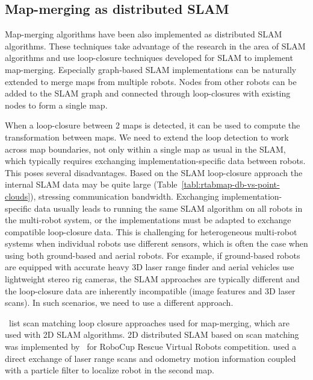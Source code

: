 \subsection{Map-merging as distributed SLAM}
\label{sec:map-merging-distributed-slam}

Map-merging algorithms have been also implemented as distributed \gls{SLAM} algorithms. These techniques take advantage of the research in the area of \gls{SLAM} algorithms and use loop-closure techniques developed for \gls{SLAM} to implement map-merging. Especially graph-based \gls{SLAM} implementations can be naturally extended to merge maps from multiple robots. Nodes from other robots can be added to the \gls{SLAM} graph and connected through loop-closures with existing nodes to form a single map.

When a loop-closure between 2 maps is detected, it can be used to compute the transformation between maps. We need to extend the loop detection to work across map boundaries, not only within a single map as usual in the \gls{SLAM}, which typically requires exchanging implementation-specific data between robots. This poses several disadvantages. Based on the \gls{SLAM} loop-closure approach the internal \gls{SLAM} data may be quite large (Table~\ref{tabl:rtabmap-db-vs-point-clouds}), stressing communication bandwidth. Exchanging implementation-specific data usually leads to running the same \gls{SLAM} algorithm on all robots in the multi-robot system, or the implementations must be adapted to exchange compatible loop-closure data. This is challenging for heterogeneous multi-robot systems when individual robots use different sensors, which is often the case when using both ground-based and aerial robots. For example, if ground-based robots are equipped with accurate heavy \gls{3D} laser range finder and aerial vehicles use lightweight stereo rig cameras, the \gls{SLAM} approaches are typically different and the loop-closure data are inherently incompatible (image features and \gls{3D} laser scans). In such scenarios, we need to use a different approach.

\citet{lee2012survey}~list scan matching loop closure approaches used for map-merging, which are used with \gls{2D} \gls{SLAM} algorithms. \gls{2D} distributed \gls{SLAM} based on scan matching was implemented by~\citet{pfingsthorn2007scalable} for RoboCup Rescue Virtual Robots competition. \citet{fox2006distributed} used a direct exchange of laser range scans and odometry motion information coupled with a particle filter to localize robot in the second map.

